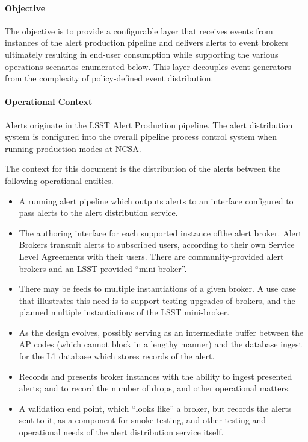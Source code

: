 \paragraph{Objective}

The objective is to provide a configurable layer that receives events from instances of the alert production pipeline and delivers alerts to event brokers ultimately resulting in end-user consumption while supporting the various operations scenarios enumerated below. This layer decouples event generators from the complexity of policy-defined event distribution.

\paragraph{Operational Context}
Alerts originate in the LSST Alert Production pipeline. The alert distribution system is configured into the overall pipeline process control system when running production modes at NCSA.

The context for this document is the distribution of the alerts between the following operational entities.

\begin{itemize}
\item A running alert pipeline which outputs alerts to an interface configured to pass alerts to the alert distribution service.

\item The authoring interface for each supported instance ofthe alert broker. Alert Brokers transmit alerts to subscribed users, according to their own Service Level Agreements with their users.  There are community-provided alert brokers and an LSST-provided “mini broker”.

\item There may be feeds to multiple instantiations of a given broker. A use case that illustrates this need is to support testing upgrades of brokers, and the planned multiple instantiations of the LSST mini-broker.

\item As the design evolves, possibly serving as an intermediate buffer between the AP codes (which cannot block in a lengthy manner) and the database ingest for the L1 database which stores records of the alert.

\item Records and presents broker instances with the ability to ingest presented alerts; and to record the number of drops, and other operational matters.

\item A validation end point, which “looks like” a broker, but records the alerts sent to it, as a component for smoke testing, and other testing and operational needs of the alert distribution service itself.

\end{itemize}

